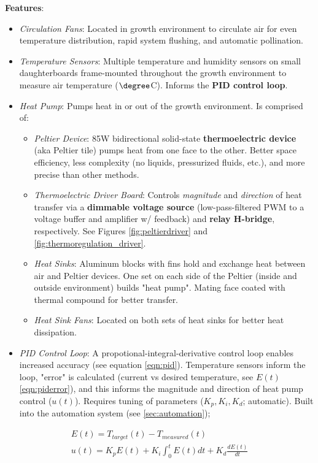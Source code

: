 \textbf{Features}:
\begin{itemize}
    \item \textit{Circulation Fans}: Located in growth environment to circulate air for even temperature distribution, rapid system flushing, and automatic pollination.
    \item \textit{Temperature Sensors}: Multiple temperature and humidity sensors \cite{sht31} on small daughterboards frame-mounted throughout the growth environment to measure air temperature ($\degree$C). Informs the \textbf{PID control loop}.
    \item \textit{Heat Pump}: Pumps heat in or out of the growth environment. Is comprised of:
    \begin{itemize}
        \item \textit{Peltier Device}: 85W bidirectional solid-state \textbf{thermoelectric device} (aka Peltier tile) \cite{peltier} pumps heat from one face to the other. Better space efficiency, less complexity (no liquids, pressurized fluids, etc.), and more precise than other methods.
        \item \textit{Thermoelectric Driver Board}: Controls \textit{magnitude} and \textit{direction} of heat transfer via a \textbf{dimmable voltage source} (low-pass-filtered PWM to a voltage buffer and amplifier w/ feedback) and \textbf{relay H-bridge}, respectively. See Figures \ref{fig:peltierdriver} and \ref{fig:thermoregulation_driver}.
        \item \textit{Heat Sinks}: Aluminum blocks with fins hold and exchange heat between air and Peltier devices. One set on each side of the Peltier (inside and outside environment) builds "heat pump". Mating face coated with thermal compound for better transfer.
        \item \textit{Heat Sink Fans}: Located on both sets of heat sinks for better heat dissipation.
    \end{itemize}
    \item \textit{PID Control Loop}: A propotional-integral-derivative control loop enables increased accuracy (see equation \ref{eqn:pid}). Temperature sensors inform the loop, "error" is calculated (current vs desired temperature, see $E(t)$ \ref{eqn:piderror}), and this informs the magnitude and direction of heat pump control ($u(t)$). Requires tuning of parameters ($K_p, K_i, K_d$; automatic). Built into the automation system (see \ref{sec:automation});
\end{itemize}

\begin{gather}
    \label{eqn:piderror}
    E(t)=T_{target}(t)-T_{measured}(t)\\
    \label{eqn:pid}
    u(t)=K_pE(t)+K_i\int_0^{t}E(t)dt+K_d\frac{dE(t)}{dt}
\end{gather}

